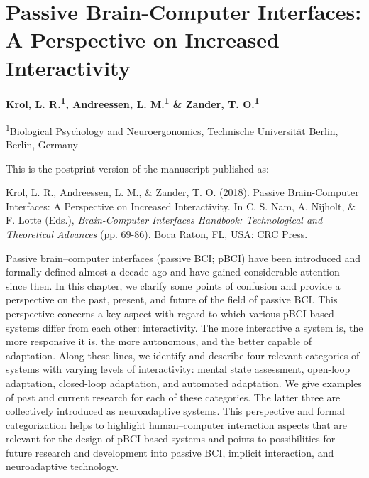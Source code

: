 
\chapter{Passive Brain-Computer Interfaces: A Perspective on Increased Interactivity}
%
\label{chapter:pbci}%


{\chaptermeta

\textbf{Krol, L. R.\textsuperscript{1}, Andreessen, L. M.\textsuperscript{1} \& Zander, T. O.\textsuperscript{1}}

{\small
\textsuperscript{1}Biological Psychology and Neuroergonomics, Technische Universität Berlin, Berlin, Germany

This is the postprint version of the manuscript published as:

Krol, L. R., Andreessen, L. M., \& Zander, T. O. (2018). Passive Brain-Computer Interfaces: A Perspective on Increased Interactivity. In C. S. Nam, A. Nijholt, \& F. Lotte (Eds.), \emph{Brain-Computer Interfaces Handbook: Technological and Theoretical Advances} (pp. 69-86). Boca Raton, FL, USA: CRC Press.\nocite{krol2018interactivity}
\par}}


\abstract%
Passive brain–computer interfaces (passive BCI; pBCI) have been introduced and formally defined almost a decade ago and have gained considerable attention since then. In this chapter, we clarify some points of confusion and provide a perspective on the past, present, and future of the field of passive BCI. This perspective concerns a key aspect with regard to which various pBCI-based systems differ from each other: interactivity. The more interactive a system is, the more responsive it is, the more autonomous, and the better capable of adaptation. Along these lines, we identify and describe four relevant categories of systems with varying levels of interactivity: mental state assessment, open-loop adaptation, closed-loop adaptation, and automated adaptation. We give examples of past and current research for each of these categories. The latter three are collectively introduced as neuroadaptive systems. This perspective and formal categorization helps to highlight human–computer interaction aspects that are relevant for the design of pBCI-based systems and points to possibilities for future research and development into passive BCI, implicit interaction, and neuroadaptive technology.


\clearpage


